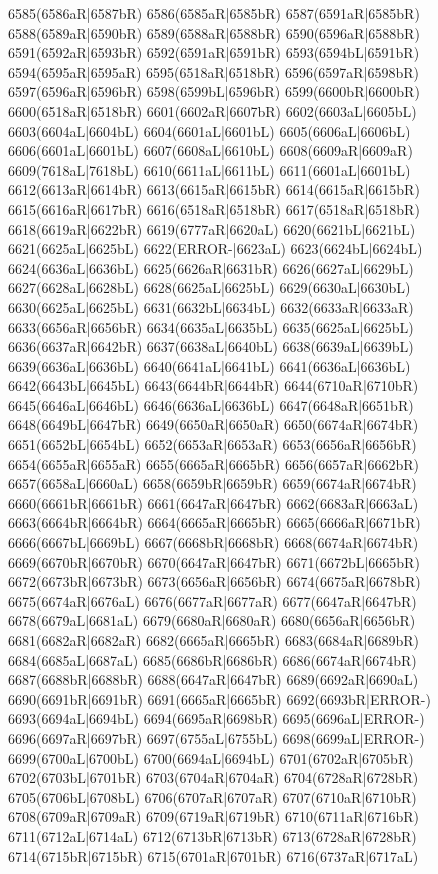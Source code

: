 6585(6586aR|6587bR) 6586(6585aR|6585bR) 6587(6591aR|6585bR) \\6588(6589aR|6590bR) 6589(6588aR|6588bR) 6590(6596aR|6588bR) 6591(6592aR|6593bR) 6592(6591aR|6591bR) 6593(6594bL|6591bR) 6594(6595aR|6595aR) 6595(6518aR|6518bR) 6596(6597aR|6598bR) \\6597(6596aR|6596bR) 6598(6599bL|6596bR) 6599(6600bR|6600bR) 6600(6518aR|6518bR) 6601(6602aR|6607bR) 6602(6603aL|6605bL) 6603(6604aL|6604bL) 6604(6601aL|6601bL) 6605(6606aL|6606bL) \\6606(6601aL|6601bL) 6607(6608aL|6610bL) 6608(6609aR|6609aR) 6609(7618aL|7618bL) 6610(6611aL|6611bL) 6611(6601aL|6601bL) 6612(6613aR|6614bR) 6613(6615aR|6615bR) 6614(6615aR|6615bR) \\6615(6616aR|6617bR) 6616(6518aR|6518bR) 6617(6518aR|6518bR) 6618(6619aR|6622bR) 6619(6777aR|6620aL) 6620(6621bL|6621bL) 6621(6625aL|6625bL) 6622(ERROR-|6623aL) 6623(6624bL|6624bL) \\6624(6636aL|6636bL) 6625(6626aR|6631bR) 6626(6627aL|6629bL) 6627(6628aL|6628bL) 6628(6625aL|6625bL) 6629(6630aL|6630bL) 6630(6625aL|6625bL) 6631(6632bL|6634bL) 6632(6633aR|6633aR) \\6633(6656aR|6656bR) 6634(6635aL|6635bL) 6635(6625aL|6625bL) 6636(6637aR|6642bR) 6637(6638aL|6640bL) 6638(6639aL|6639bL) 6639(6636aL|6636bL) 6640(6641aL|6641bL) 6641(6636aL|6636bL) \\6642(6643bL|6645bL) 6643(6644bR|6644bR) 6644(6710aR|6710bR) 6645(6646aL|6646bL) 6646(6636aL|6636bL) 6647(6648aR|6651bR) 6648(6649bL|6647bR) 6649(6650aR|6650aR) 6650(6674aR|6674bR) \\6651(6652bL|6654bL) 6652(6653aR|6653aR) 6653(6656aR|6656bR) 6654(6655aR|6655aR) 6655(6665aR|6665bR) 6656(6657aR|6662bR) 6657(6658aL|6660aL) 6658(6659bR|6659bR) 6659(6674aR|6674bR) \\6660(6661bR|6661bR) 6661(6647aR|6647bR) 6662(6683aR|6663aL) 6663(6664bR|6664bR) 6664(6665aR|6665bR) 6665(6666aR|6671bR) 6666(6667bL|6669bL) 6667(6668bR|6668bR) 6668(6674aR|6674bR) \\6669(6670bR|6670bR) 6670(6647aR|6647bR) 6671(6672bL|6665bR) 6672(6673bR|6673bR) 6673(6656aR|6656bR) 6674(6675aR|6678bR) 6675(6674aR|6676aL) 6676(6677aR|6677aR) 6677(6647aR|6647bR) \\6678(6679aL|6681aL) 6679(6680aR|6680aR) 6680(6656aR|6656bR) 6681(6682aR|6682aR) 6682(6665aR|6665bR) 6683(6684aR|6689bR) 6684(6685aL|6687aL) 6685(6686bR|6686bR) 6686(6674aR|6674bR) \\6687(6688bR|6688bR) 6688(6647aR|6647bR) 6689(6692aR|6690aL) 6690(6691bR|6691bR) 6691(6665aR|6665bR) 6692(6693bR|ERROR-) 6693(6694aL|6694bL) 6694(6695aR|6698bR) 6695(6696aL|ERROR-) \\6696(6697aR|6697bR) 6697(6755aL|6755bL) 6698(6699aL|ERROR-) 6699(6700aL|6700bL) 6700(6694aL|6694bL) 6701(6702aR|6705bR) 6702(6703bL|6701bR) 6703(6704aR|6704aR) 6704(6728aR|6728bR) \\6705(6706bL|6708bL) 6706(6707aR|6707aR) 6707(6710aR|6710bR) 6708(6709aR|6709aR) 6709(6719aR|6719bR) 6710(6711aR|6716bR) 6711(6712aL|6714aL) 6712(6713bR|6713bR) 6713(6728aR|6728bR) \\6714(6715bR|6715bR) 6715(6701aR|6701bR) 6716(6737aR|6717aL) 